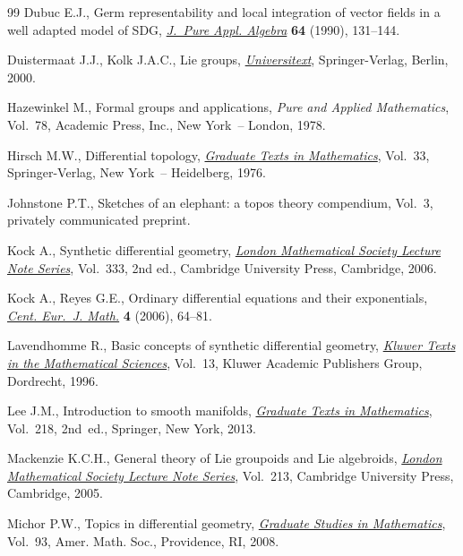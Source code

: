 \begin{thebibliography}{99}
Dubuc E.J., Germ representability and local integration of vector f\/ields in a
 well adapted model of {SDG}, \href{https://doi.org/10.1016/0022-4049(90)90152-8}{\textit{J.~Pure Appl. Algebra}} \textbf{64}
 (1990), 131--144.

Duistermaat J.J., Kolk J.A.C., Lie groups, \href{https://doi.org/10.1007/978-3-642-56936-4}{\textit{Universitext}}, Springer-Verlag,
 Berlin, 2000.

Hazewinkel M., Formal groups and applications, \textit{Pure and Applied
 Mathematics}, Vol.~78, Academic Press, Inc., New York~-- London, 1978.

Hirsch M.W., Dif\/ferential topology, \href{https://doi.org/10.1007/978-1-4684-9449-5}{\textit{Graduate Texts in Mathematics}},
 Vol.~33, Springer-Verlag, New York~-- Heidelberg, 1976.

Johnstone P.T., Sketches of an elephant: a topos theory compendium, {V}ol.~3,
 {p}rivately communicated preprint.

Kock A., Synthetic dif\/ferential geometry, \href{https://doi.org/10.1017/CBO9780511550812}{\textit{London Mathematical Society
 Lecture Note Series}}, Vol.~333, 2nd ed., Cambridge University Press,
 Cambridge, 2006.

Kock A., Reyes G.E., Ordinary dif\/ferential equations and their exponentials,
 \href{https://doi.org/10.1007/s11533-005-0005-2}{\textit{Cent. Eur.~J. Math.}} \textbf{4} (2006), 64--81.

Lavendhomme R., Basic concepts of synthetic dif\/ferential geometry,
 \href{https://doi.org/10.1007/978-1-4757-4588-7}{\textit{Kluwer Texts in the Mathematical Sciences}}, Vol.~13, Kluwer Academic
 Publishers Group, Dordrecht, 1996.

Lee J.M., Introduction to smooth manifolds, \href{https://doi.org/10.1007/978-1-4419-9982-5}{\textit{Graduate Texts in
 Mathematics}}, Vol.~218, 2nd~ed., Springer, New York, 2013.

Mackenzie K.C.H., General theory of {L}ie groupoids and {L}ie algebroids,
 \href{https://doi.org/10.1017/CBO9781107325883}{\textit{London Mathematical Society Lecture Note Series}}, Vol.~213, Cambridge
 University Press, Cambridge, 2005.

Michor P.W., Topics in dif\/ferential geometry, \href{https://doi.org/10.1090/gsm/093}{\textit{Graduate Studies in
 Mathematics}}, Vol.~93, Amer. Math. Soc., Providence, RI, 2008.


\end{thebibliography}
